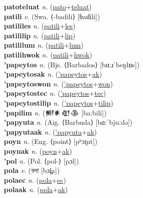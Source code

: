 \textbf{patoteluat} \textit{n.} (\hyperref[pato]{pato}+\hyperref[teluat]{teluat})
 \label{patoteluat} \\
\textbf{patili} \textit{v.} (Swa. ⟨-badili⟩ [ɓaɗili])
 \label{patili} \\
\textbf{patililes} \textit{n.} (\hyperref[patili]{patili}+\hyperref[les]{les})
 \label{patililes} \\
\textbf{patililip} \textit{n.} (\hyperref[patili]{patili}+\hyperref[lip]{lip})
 \label{patililip} \\
\textbf{patililum} \textit{n.} (\hyperref[patili]{patili}+\hyperref[lum]{lum})
 \label{patililum} \\
\textbf{patilihwok} \textit{n.} (\hyperref[patili]{patili}+\hyperref[hwok]{hwok})
 \label{patilihwok} \\
\textbf{'papeytos} \textit{n.} (Bjs. ⟨Barbados⟩ [bɑːɹˈbeɪ̯dɒs])
 \label{'papeytos} \\
\textbf{'papeytosak} \textit{n.} (\hyperref['papeytos]{'papeytos}+\hyperref[ak]{ak})
 \label{'papeytosak} \\
\textbf{'papeytoswon} \textit{n.} (\hyperref['papeytos]{'papeytos}+\hyperref[won]{won})
 \label{'papeytoswon} \\
\textbf{'papeytostec} \textit{n.} (\hyperref['papeytos]{'papeytos}+\hyperref[tec]{tec})
 \label{'papeytostec} \\
\textbf{'papeytostilip} \textit{n.} (\hyperref['papeytos]{'papeytos}+\hyperref[tilip]{tilip})
 \label{'papeytostilip} \\
\textbf{'papilim} \textit{n.} ({\cuneiform{}𒆍𒀭𒊏𒆠} [baːbili])
 \label{'papilim} \\
\textbf{'papyuta} \textit{n.} (Aig. ⟨Barbuda⟩ [bɑːˈbjuːdə])
 \label{'papyuta} \\
\textbf{'papyutaak} \textit{n.} (\hyperref['papyuta]{'papyuta}+\hyperref[ak]{ak})
 \label{'papyutaak} \\
\textbf{poyn} \textit{n.} (Eng. ⟨point⟩ [pʰɔɪ̯nt])
 \label{poyn} \\
\textbf{poynak} \textit{n.} (\hyperref[poyn]{poyn}+\hyperref[ak]{ak})
 \label{poynak} \\
\textbf{'pol} \textit{n.} (Pol. ⟨pol-⟩ [pɔl])
 \label{'pol} \\
\textbf{pola} \textit{v.} ({\bengali{}বলা} [bɔl̪a])
 \label{pola} \\
\textbf{polaec} \textit{n.} (\hyperref[pola]{pola}+\hyperref[ec]{ec})
 \label{polaec} \\
\textbf{polaak} \textit{n.} (\hyperref[pola]{pola}+\hyperref[ak]{ak})
